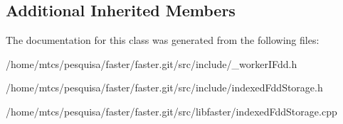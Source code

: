 \subsection*{Additional Inherited Members}


The documentation for this class was generated from the following files\+:\begin{DoxyCompactItemize}
\item 
/home/mtcs/pesquisa/faster/faster.\+git/src/include/\+\_\+worker\+I\+Fdd.\+h\item 
/home/mtcs/pesquisa/faster/faster.\+git/src/include/indexed\+Fdd\+Storage.\+h\item 
/home/mtcs/pesquisa/faster/faster.\+git/src/libfaster/indexed\+Fdd\+Storage.\+cpp\end{DoxyCompactItemize}
